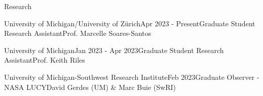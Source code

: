 \documentclass{resume} %
\begin{document}
\begin{rSection}{Research}


\begin{rSubsection}{University of Michigan/University of Zürich}{Apr 2023 - Present}{Graduate Student Research Assistant}{Prof. Marcelle Soares-Santos}
\end{rSubsection}

\begin{rSubsection}{University of Michigan}{Jan 2023 - Apr 2023}{Graduate Student Research Assistant}{Prof. Keith Riles}
\end{rSubsection}

\begin{rSubsection}{University of Michigan-Southwest Research Institute}{Feb 2023}{Graduate Observer - NASA LUCY}{David Gerdes (UM) \& Marc Buie (SwRI)}
\end{rSubsection}


\end{rSection}
\end{document}
